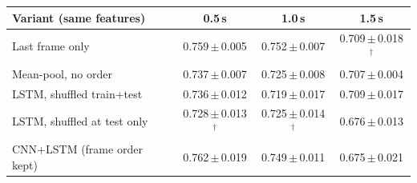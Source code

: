 \scriptsize
\setlength{\tabcolsep}{2.5pt}
\begin{tabular}{@{}lccc@{}}
\toprule
Variant (same features) & 0.5\,s & 1.0\,s & 1.5\,s \\
\midrule
Last frame only & 0.759\,$\pm$\,0.005 & 0.752\,$\pm$\,0.007 & 0.709\,$\pm$\,0.018$^{\dagger}$ \\
Mean-pool, no order & 0.737\,$\pm$\,0.007 & 0.725\,$\pm$\,0.008 & 0.707\,$\pm$\,0.004 \\
LSTM, shuffled train+test & 0.736\,$\pm$\,0.012 & 0.719\,$\pm$\,0.017 & 0.709\,$\pm$\,0.017 \\
LSTM, shuffled at test only & 0.728\,$\pm$\,0.013$^{\dagger}$ & 0.725\,$\pm$\,0.014$^{\dagger}$ & 0.676\,$\pm$\,0.013 \\
CNN+LSTM (frame order kept) & 0.762\,$\pm$\,0.019 & 0.749\,$\pm$\,0.011 & 0.675\,$\pm$\,0.021 \\
\bottomrule
\end{tabular}
